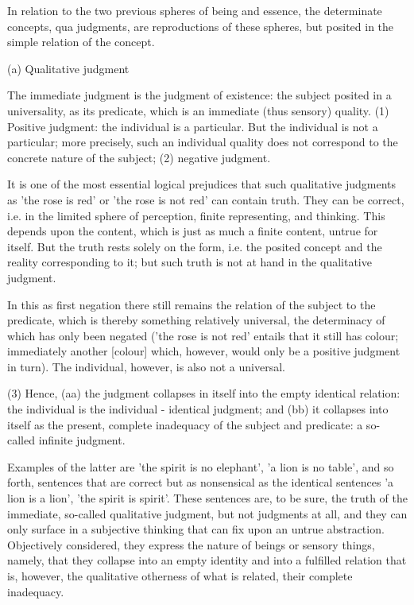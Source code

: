 In relation to the two previous spheres of being and essence,
the determinate concepts, qua judgments,
are reproductions of these spheres,
but posited in the simple relation of the concept.

(a) Qualitative judgment

The immediate judgment is the judgment of existence:
the subject posited in a universality, as its predicate,
which is an immediate (thus sensory) quality.
(1) Positive judgment: the individual is a particular.
But the individual is not a particular;
more precisely, such an individual quality
does not correspond to the concrete nature of the subject;
(2) negative judgment.

It is one of the most essential logical prejudices
that such qualitative judgments as 'the rose is red'
or 'the rose is not red' can contain truth.
They can be correct, i.e. in the limited sphere of
perception, finite representing, and thinking.
This depends upon the content,
which is just as much a finite content,
untrue for itself.
But the truth rests solely on the form, i.e.
the posited concept
and the reality corresponding to it;
but such truth is not at hand in the qualitative judgment.

In this as first negation there still remains
the relation of the subject to the predicate,
which is thereby something relatively universal,
the determinacy of which has only been negated
('the rose is not red' entails that it still has colour;
immediately another [colour] which, however,
would only be a positive judgment in turn).
The individual, however, is also not a universal.

(3) Hence,
(aa) the judgment collapses in itself
into the empty identical relation:
the individual is the individual - identical judgment;
and (bb) it collapses into itself as the present,
complete inadequacy of the subject and predicate:
a so-called infinite judgment.

Examples of the latter are
'the spirit is no elephant',
'a lion is no table',
and so forth,
sentences that are correct
but as nonsensical as the identical sentences
'a lion is a lion',
'the spirit is spirit'.
These sentences are, to be sure,
the truth of the immediate,
so-called qualitative judgment,
but not judgments at all,
and they can only surface in a subjective thinking
that can fix upon an untrue abstraction.
Objectively considered, they express
the nature of beings
or sensory things, namely,
that they collapse into an empty identity
and into a fulfilled relation that is, however,
the qualitative otherness of what is related,
their complete inadequacy.

